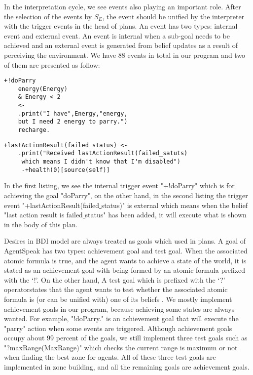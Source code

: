 In the interpretation cycle, we see events also playing an important role. After the selection of the events by $S_E$, the event should be unified by the interpreter with the trigger events in the head of plans. An event has two types: internal event and external event. An event is internal when a sub-goal needs to be achieved and an external event is generated from belief updates as a result of perceiving the environment. We have 88 events in total in our program and two of them are presented as follow:

\begin{lstlisting}[caption={External Trigger Event.}]
+!doParry
    energy(Energy)
    & Energy < 2
    <-
    .print("I have",Energy,"energy, 
    but I need 2 energy to parry.")
    recharge.
\end{lstlisting}

\begin{lstlisting}[caption={Internal Trigger Event.}]
+lastActionResult(failed status) <-
    .print("Received lastActionResult(failed_satuts)
     which means I didn't know that I'm disabled")
     -+health(0)[source(self)]
\end{lstlisting}
 
In the first listing, we see the internal trigger event "+!doParry" which is for achieving the goal "doParry", on the other hand, in the second listing the trigger event "+lastActionResult(failed\underline{ }status)" is external which means when the belief "last action result is failed\underline{ }status" has been added, it will execute what is shown in the body of this plan.  

Desires in BDI model are always treated as goals which used in plans. A goal of AgentSpeak has two types: achievement goal and test goal. When the associated atomic formula is true, and the agent wants to achieve a state of the world, it is stated as an achievement goal with being formed by an atomic formula prefixed with the ‘!’. On the other hand, A test goal which is prefixed with the ‘?’ operatorstates that the agent wants to test whether the associated atomic formula is (or can be unified with) one of its beliefs \cite{rafael_BDIAgent_2005}. We mostly implement achievement goals in our program, because achieving some states are always wanted. For example, "!doParry." is an achievement goal that will execute the "parry" action when some events are triggered. Although achievement goals occupy about 99 percent of the goals, we still implement three test goals such as "?maxRange(MaxRange)" which checks the current range is maximum or not when finding the best zone for agents. All of these three test goals are implemented in zone building, and all the remaining goals are achievement goals.

